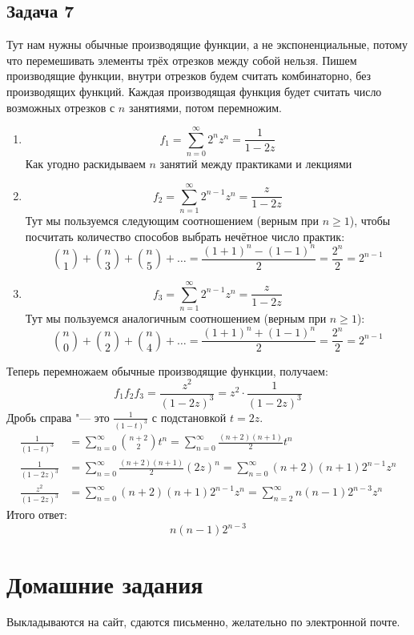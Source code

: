 \subsection{Задача 7}
	Тут нам нужны обычные производящие функции, а не экспоненциальные, потому что перемешивать
	элементы трёх отрезков между собой нельзя.
	Пишем производящие функции, внутри отрезков будем считать комбинаторно, без производящих функций.
	Каждая производящая функция будет считать число возможных отрезков с $n$ занятиями, потом перемножим.
	\begin{enumerate}
		\item
			\[ f_1=\sum_{n=0}^\infty 2^nz^n = \frac{1}{1-2z}\]
			Как угодно раскидываем $n$ занятий между практиками и лекциями
		\item
			\[ f_2=\sum_{n=1}^\infty 2^{n-1}z^n = \frac{z}{1-2z} \]
			Тут мы пользуемся следующим соотношением (верным при $n \ge 1$), чтобы посчитать количество способов выбрать нечётное число практик:
			\[ \binom{n}{1}+\binom{n}{3}+\binom{n}{5}+\dots = \frac{(1+1)^n-(1-1)^n}{2} = \frac{2^n}{2} = 2^{n-1} \]
		\item
			\[ f_3=\sum_{n=1}^\infty 2^{n-1}z^n = \frac{z}{1-2z} \]
			Тут мы пользуемся аналогичным соотношением (верным при $n \ge 1$):
			\[ \binom{n}{0}+\binom{n}{2}+\binom{n}{4}+\dots = \frac{(1+1)^n+(1-1)^n}{2} = \frac{2^n}{2} = 2^{n-1} \]
	\end{enumerate}
	Теперь перемножаем обычные производящие функции, получаем:
	\[ f_1f_2f_3 = \frac{z^2}{(1-2z)^3} = z^2 \cdot \frac{1}{(1-2z)^3} \]
	Дробь справа "--- это $\frac{1}{(1-t)^3}$ с подстановкой $t=2z$.
	\begin{align*}
		\frac{1}{(1-t)^3} &= \sum_{n=0}^\infty \binom{n+2}{2}t^n = \sum_{n=0}^\infty \frac{(n+2)(n+1)}{2}t^n \\
		\frac{1}{(1-2z)^3} &= \sum_{n=0}^\infty \frac{(n+2)(n+1)}{2}(2z)^n = \sum_{n=0}^\infty (n+2)(n+1)2^{n-1} z^n \\
		\frac{z^2}{(1-2z)^3}
		&= \sum_{n=0}^\infty (n+2)(n+1)2^{n-1} z^n
		= \sum_{n=2}^\infty n(n-1)2^{n-3} z^n
	\end{align*}
	Итого ответ:
	\[ n(n-1)2^{n-3} \]

\section{Домашние задания}
	Выкладываются на сайт, сдаются письменно, желательно по электронной почте.
